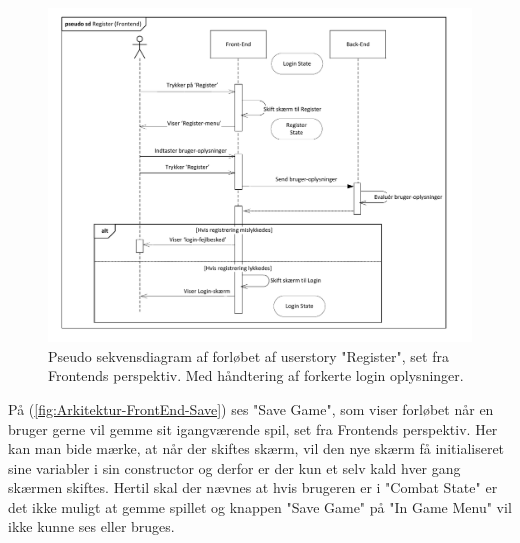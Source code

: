\begin{figure}[h]
\centering
\includegraphics[width = \textwidth]{02-Body/Images/Front-End_-_Arkitektur-register.pdf}
\caption{Pseudo sekvensdiagram af forløbet af userstory "Register", set fra Frontends perspektiv. Med håndtering af forkerte login oplysninger.}
\label{fig:Arkitektur-FrontEnd-Register}
\end{figure}

\noindent På (\autoref{fig:Arkitektur-FrontEnd-Save}) ses "Save Game", som viser forløbet når en bruger gerne vil gemme sit igangværende spil, set fra Frontends perspektiv. Her kan man bide mærke, at når der skiftes skærm, vil den nye skærm få initialiseret sine variabler i sin constructor og derfor er der kun et selv kald hver gang skærmen skiftes.
Hertil skal der nævnes at hvis brugeren er i "Combat State" er det ikke muligt at gemme spillet og knappen "Save Game" på "In Game Menu" vil ikke kunne ses eller bruges.\\

